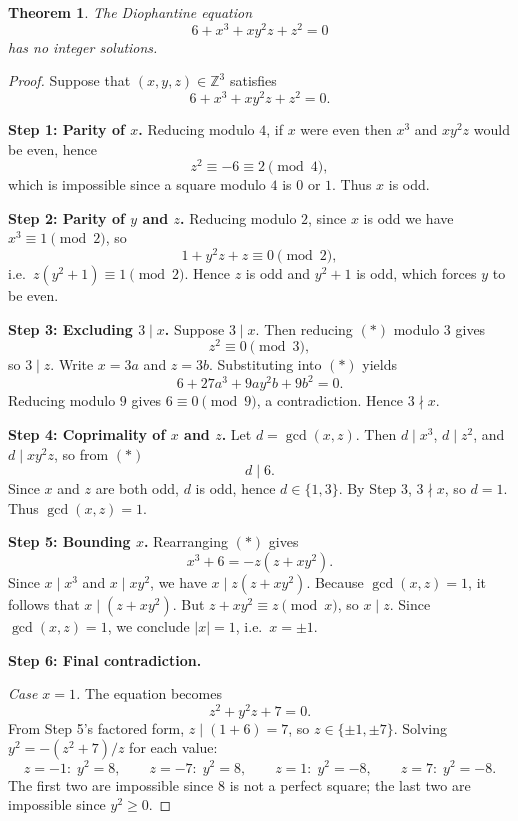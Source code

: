 \documentclass[12pt]{article}
\newtheorem{theorem}{Theorem}
\begin{document}
\begin{theorem}
The Diophantine equation
\[
6 + x^3 + x y^2 z + z^2 = 0
\]
has no integer solutions.
\end{theorem}

\begin{proof}
Suppose that $(x,y,z)\in\mathbb{Z}^3$ satisfies
\[
6 + x^3 + x y^2 z + z^2 = 0.
\tag{$*$}
\]

\medskip

\noindent\textbf{Step 1: Parity of $x$.}
Reducing modulo $4$, if $x$ were even then $x^3$ and $x y^2 z$ would be even, hence
\[
z^2 \equiv -6 \equiv 2 \pmod{4},
\]
which is impossible since a square modulo $4$ is $0$ or $1$. Thus $x$ is odd.

\medskip

\noindent\textbf{Step 2: Parity of $y$ and $z$.}
Reducing modulo $2$, since $x$ is odd we have $x^3 \equiv 1 \pmod{2}$, so
\[
1 + y^2 z + z \equiv 0 \pmod{2},
\]
i.e.\ $z(y^2+1) \equiv 1 \pmod{2}$. Hence $z$ is odd and $y^2+1$ is odd, which forces $y$
to be even.

\medskip

\noindent\textbf{Step 3: Excluding $3 \mid x$.}
Suppose $3 \mid x$. Then reducing $(*)$ modulo $3$ gives
\[
z^2 \equiv 0 \pmod{3},
\]
so $3 \mid z$. Write $x=3a$ and $z=3b$. Substituting into $(*)$ yields
\[
6 + 27a^3 + 9a y^2 b + 9b^2 = 0.
\]
Reducing modulo $9$ gives $6 \equiv 0 \pmod{9}$, a contradiction. Hence $3 \nmid x$.

\medskip

\noindent\textbf{Step 4: Coprimality of $x$ and $z$.}
Let $d=\gcd(x,z)$. Then $d \mid x^3$, $d \mid z^2$, and $d \mid x y^2 z$, so from $(*)$
\[
d \mid 6.
\]
Since $x$ and $z$ are both odd, $d$ is odd, hence $d \in \{1,3\}$. By Step 3, $3 \nmid x$,
so $d=1$. Thus $\gcd(x,z)=1$.

\medskip

\noindent\textbf{Step 5: Bounding $x$.}
Rearranging $(*)$ gives
\[
x^3 + 6 = -z(z + xy^2).
\]
Since $x \mid x^3$ and $x \mid xy^2$, we have $x \mid z(z + xy^2)$.  Because
$\gcd(x,z)=1$, it follows that $x \mid (z+xy^2)$.  But $z+xy^2 \equiv z \pmod{x}$,
so $x \mid z$.  Since $\gcd(x,z)=1$, we conclude $|x| = 1$, i.e.\ $x = \pm 1$.

\medskip

\noindent\textbf{Step 6: Final contradiction.}

\smallskip

\emph{Case $x=1$.} The equation becomes
\[
z^2 + y^2 z + 7 = 0.
\]
From Step 5's factored form, $z \mid (1+6)=7$, so $z \in \{\pm 1,\pm 7\}$.
Solving $y^2 = -(z^2+7)/z$ for each value:
\[
z = -1:\; y^2 = 8,\qquad z = -7:\; y^2 = 8,\qquad z = 1:\; y^2 = -8,\qquad z = 7:\; y^2 = -8.
\]
The first two are impossible since $8$ is not a perfect square; the last two are impossible
since $y^2 \geq 0$.


\end{proof}
\end{document}
